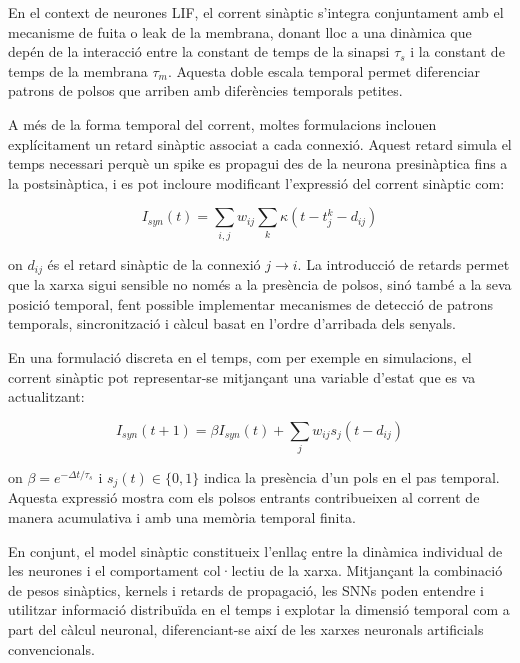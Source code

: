 \documentclass[a4paper,11pt, titlepage, twoside]{article}
\begin{document}
En el context de neurones LIF, el corrent sinàptic s'integra conjuntament amb el mecanisme de fuita o leak de la membrana, donant lloc a una dinàmica que depén de la interacció entre la constant de temps de la sinapsi $\tau_{s}$ i la constant de temps de la membrana $\tau_{m}$. Aquesta doble escala temporal permet diferenciar patrons de polsos que arriben amb diferències temporals petites.

A més de la forma temporal del corrent, moltes formulacions inclouen explícitament un retard sinàptic associat a cada connexió. Aquest retard simula el temps necessari perquè un spike es propagui des de la neurona presinàptica fins a la postsinàptica, i es pot incloure modificant l'expressió del corrent sinàptic com:

\begin{equation}
	I_{syn}(t) = \sum_{i,j} w_{ij} \sum_{k} \kappa(t - t_{j}^k-d_{ij})
\end{equation}

on $d_{ij}$ és el retard sinàptic de la connexió $j \rightarrow i$. La introducció de retards permet que la xarxa sigui sensible no només a la presència de polsos, sinó també a la seva posició temporal, fent possible implementar mecanismes de detecció de patrons temporals, sincronització i càlcul basat en l'ordre d'arribada dels senyals.

En una formulació discreta en el temps, com per exemple en simulacions, el corrent sinàptic pot representar-se mitjançant una variable d'estat que es va actualitzant:

\begin{equation}
	I_{syn}(t+1) = \beta I_{syn}(t) + \sum_j w_{ij} s_j(t - d_{ij})
\end{equation}

on $\beta = e^{-\Delta t/\tau_{s}}$ i $s_j(t) \in \{0,1\}$ indica la presència d'un pols en el pas temporal. Aquesta expressió mostra com els polsos entrants contribueixen al corrent de manera acumulativa i amb una memòria temporal finita.

En conjunt, el model sinàptic constitueix l'enllaç entre la dinàmica individual de les neurones i el comportament col·lectiu de la xarxa. Mitjançant la combinació de pesos sinàptics, kernels i retards de propagació, les SNNs poden entendre i utilitzar informació distribuïda en el temps i explotar la dimensió temporal com a part del càlcul neuronal, diferenciant-se així de les xarxes neuronals artificials convencionals.

\end{document}
